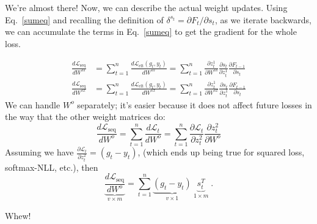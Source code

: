 \begin{enumerate}[(1)]
        We're almost there!  Now, we can describe the actual weight updates.
        Using Eq.~\ref{sumeq} and recalling the definition of
        $\delta^{s_t} = \partial F_t / \partial s_t$,
        as we iterate backwards, we can accumulate the terms in Eq.~\ref{sumeq}
        to get the gradient for the whole  loss.

        \begin{align}
          \frac{d \mathcal{L}_\text{seq}}{d W^{ss}} & = \sum_{t=1}^n
          \frac{d \mathcal{L}_\text{elt}(g_t, y_t)}{d W^{ss}} = \sum_{t=1}^n \frac{\partial z_t^1}{\partial W^{ss}} \frac{\partial s_t}{\partial z_t^1} \frac{\partial F_{t - 1}}{\partial s_t} \\
          \frac{d \mathcal{L}_\text{seq}}{d W^{sx}} & =  \sum_{t=1}^n
          \frac{d \mathcal{L}_\text{elt}(g_t, y_t)}{d W^{sx}} = \sum_{t=1}^n
          \frac{\partial z_t^1}{\partial W^{sx}} \frac{\partial s_t}{\partial z_t^1} \frac{\partial F_{t-1}}{\partial s_t}
        \end{align}
        We can handle $W^o$ separately;   it's easier because it does not
        affect future  losses  in the way that the other weight matrices do:
        \begin{equation}
          \frac{d\mathcal{L}_\text{seq}}{d W^o} = \sum_{t = 1}^n\frac{d \mathcal{L}_t}{d W^o} = \sum_{t = 1}^n\frac{\partial \mathcal{L}_t}{\partial
            z_t^2} \frac{\partial z_t^2}{\partial W^o}
        \end{equation}
        Assuming we have $\frac{\partial \mathcal{L}_t}{\partial z_t^2} = (g_t - y_t)$,
        (which ends up being true for squared loss, softmax-NLL, etc.), then
        \begin{equation}
          \underbrace{\frac{d \mathcal{L}_\text{seq}}{d W^o}}_{v \times m} = \sum_{t=1}^n \underbrace{(g_t - y_t)}_{v \times 1} ~ \underbrace{s_t^T}_{1 \times m} \; .
        \end{equation}

        Whew!
\end{enumerate}

